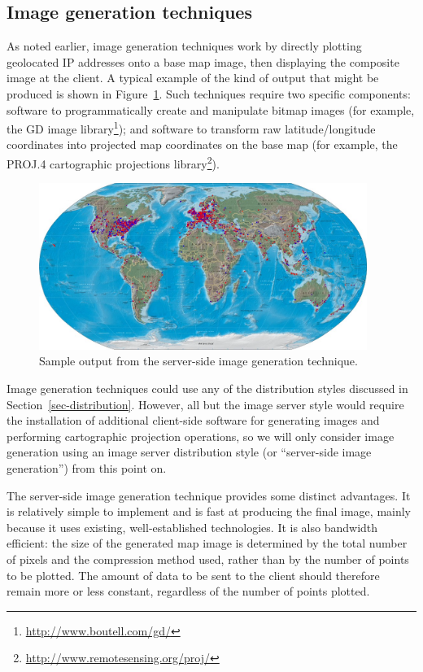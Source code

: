 \documentclass[acmtocl,acmnow]{acmtrans2m}
\begin{document}
\subsection{Image generation techniques}
\label{sec-image-gen}

As noted earlier, image generation techniques work by directly plotting
geolocated IP addresses onto a base map image, then displaying the
composite image at the client. A typical example of the kind of output
that might be produced is shown in Figure~\ref{fig-image}. Such
techniques require two specific components: software to programmatically
create and manipulate bitmap images (for example, the GD image
library\footnote{\url{http://www.boutell.com/gd/}}); and software to
transform raw latitude/longitude coordinates into projected map
coordinates on the base map (for example, the PROJ.4 cartographic
projections library\footnote{\url{http://www.remotesensing.org/proj/}}).


\begin{figure}
	\begin{center}
		\includegraphics[width=0.95\textwidth,keepaspectratio]{ImageGeneration-full}
	\end{center}
	\caption{Sample output from the server-side image generation technique.}
	\label{fig-image}
\end{figure}


Image generation techniques could use any of the distribution styles
discussed in Section~\ref{sec-distribution}. However, all but the image
server style would require the installation of additional client-side
software for generating images and performing cartographic projection
operations, so we will only consider image generation using an image
server distribution style (or ``server-side image generation'') from
this point on.

The server-side image generation technique provides some distinct
advantages. It is relatively simple to implement and is fast at
producing the final image, mainly because it uses existing,
well-established technologies. It is also bandwidth efficient: the size
of the generated map image is determined by the total number of pixels
and the compression method used, rather than by the number of points to
be plotted. The amount of data to be sent to the client should therefore
remain more or less constant, regardless of the number of points
plotted.
\end{document}
